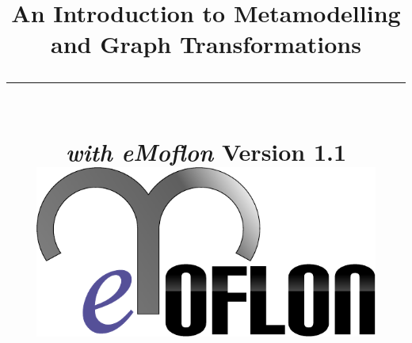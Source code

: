 \title{
\flushright
{\LARGE\bfseries An Introduction to Metamodelling\\
and Graph Transformations}
\noindent\rule[-1ex]{\textwidth}{5pt}\\[2.5ex]
\hfill\emph{\LARGE\bfseries with eMoflon}
\flushleft
{\small Version 1.1}
\flushright
\includegraphics[width=0.85\textwidth]{pics/eMoflon3} 
}

\date{}  
\author{} 